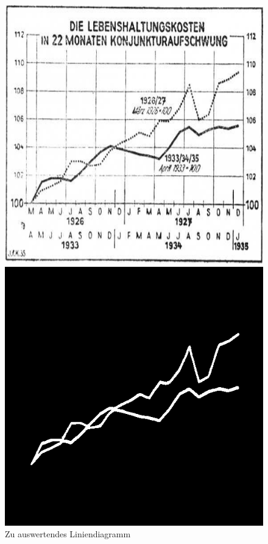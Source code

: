 \begin{figure}[H] %
    \centering
    \begin{minipage}{0.315\textwidth} %
        \centering
        \includegraphics[width=\linewidth]{Implementation/img/alg_input.png}
        \caption{ Zu auswertendes Liniendiagramm}
        \label{fig:alg_input}
    \end{minipage}\hfill %
    \begin{minipage}{0.315\textwidth} %
        \centering
        \includegraphics[width=\linewidth]{Implementation/img/alg_pred.png}

\end{minipage}
\end{figure}

